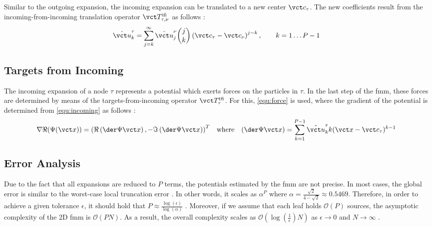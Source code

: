 Similar to the outgoing expansion, the incoming expansion can be translated to a new center $\vct c_\tau$.
The new coefficients result from the incoming-from-incoming translation operator $\vct T_{\tau, \nu}^\mathrm{ifi}$ as follows \cite{Martinsson2015}:
\begin{equation}
  \hat{\vct u}_{k}^\tau = \sum_{j=k}^{\infty} \hat{\vct u}_{j}^\nu \binom jk \left(\vct c_\tau-\vct c_\nu\right)^{j-k}, \qquad k = 1 \dots P-1
\end{equation}

\subsection{Targets from Incoming}

The incoming expansion of a node $\tau$ represents a potential which exerts forces on the particles in $\tau$.
In the last step of the \gls{fmm}, these forces are determined by means of the targets-from-incoming operator $\vct T_\tau^\mathrm{tfi}$.
For this, \cref{equ:force} is used, where the gradient of the potential is determined from \cref{equ:incoming} as follows \cite{short-course}:
\begin{align}
  \nabla \Re(\Psi(\vct x)) = \left(\Re\left(\der\Psi{\vct x}\right), -\Im\left(\der\Psi{\vct x}\right)\right)^T
  && \text{where} &&
  \left(\der\Psi{\vct x}\right) = \sum_{k=1}^{P-1} \hat{\vct u}_k^\tau k (\vct x - \vct c_\tau)^{k-1}
\end{align}

\subsection{Error Analysis}

Due to the fact that all expansions are reduced to $P$ terms, the potentials estimated by the \gls{fmm} are not precise.
In most cases, the global error is similar to the worst-case local truncation error \cite{articleErick}.
In other words, it scales as  $\alpha^P$ where  $\alpha = \frac{\sqrt{2}}{4-\sqrt{2}} \approx 0.5469$.
Therefore, in order to achieve a given tolerance $\epsilon$, it should hold that $P \approx \frac{\log (\epsilon)}{\log (\alpha)}$ \cite{Martinsson2015}.
Moreover, if we assume that each leaf holds $\mathcal{O}(P)$ sources, the asymptotic complexity of the 2D \gls{fmm} is $\mathcal{O}(P N)$.
As a result, the overall complexity scales as $\mathcal{O}(\log \left( \frac 1 \epsilon \right) N)$ as $\epsilon \rightarrow 0$ and $N \rightarrow \infty$ \cite{Martinsson2015}.
